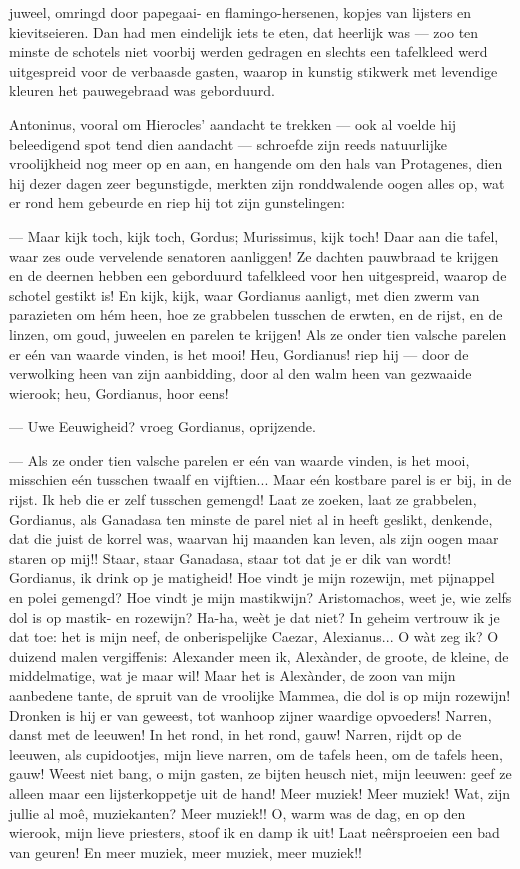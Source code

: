 \documentclass[a4paper, 12pt, oneside, dutch]{article}
\begin{document}
juweel, omringd door papegaai- en flamingo-hersenen, kopjes van lijsters en kievitseieren. Dan had men eindelijk iets te eten, dat heerlijk was --- zoo ten minste de schotels niet voorbij werden gedragen en slechts een tafelkleed werd uitgespreid voor de verbaasde gasten, waarop in kunstig stikwerk met levendige kleuren het pauwegebraad was geborduurd.

Antoninus, vooral om Hierocles' aandacht te trekken --- ook al voelde hij beleedigend spot tend dien aandacht --- schroefde zijn reeds natuurlijke vroolijkheid nog meer op en aan, en hangende om den hals van Protagenes, dien hij dezer dagen zeer begunstigde, merkten zijn ronddwalende oogen alles op, wat er rond hem gebeurde en riep hij tot zijn gunstelingen:

--- Maar kijk toch, kijk toch, Gordus; Murissimus, kijk toch! Daar aan die tafel, waar zes oude vervelende senatoren aanliggen! Ze dachten pauwbraad te krijgen en de deernen hebben een geborduurd tafelkleed voor hen uitgespreid, waarop de schotel gestikt is! En kijk, kijk, waar Gordianus aanligt, met dien zwerm van parazieten om hém heen, hoe ze grabbelen tusschen de erwten, en de rijst, en de linzen, om goud, juweelen en parelen te krijgen! Als ze onder tien valsche parelen er eén van waarde vinden, is het mooi! Heu, Gordianus! riep hij --- door de verwolking heen van zijn aanbidding, door al den walm heen van gezwaaide wierook; heu, Gordianus, hoor eens!

--- Uwe Eeuwigheid? vroeg Gordianus, oprijzende.

--- Als ze onder tien valsche parelen er eén van waarde vinden, is het mooi, misschien eén tusschen twaalf en vijftien... Maar eén kostbare parel is er bij, in de rijst. Ik heb die er zelf tusschen gemengd! Laat ze zoeken, laat ze grabbelen, Gordianus, als Ganadasa ten minste de parel niet al in heeft geslikt, denkende, dat die juist de korrel was, waarvan hij maanden kan leven, als zijn oogen maar staren op mij!! Staar, staar Ganadasa, staar tot dat je er dik van wordt! Gordianus, ik drink op je matigheid! Hoe vindt je mijn rozewijn, met pijnappel en polei gemengd? Hoe vindt je mijn mastikwijn? Aristomachos, weet je, wie zelfs dol is op mastik- en rozewijn? Ha-ha, weèt je dat niet? In geheim vertrouw ik je dat toe: het is mijn neef, de onberispelijke Caezar, Alexianus... O wàt zeg ik? O duizend malen vergiffenis: Alexander meen ik, Alexànder, de groote, de kleine, de middelmatige, wat je maar wil! Maar het is Alexànder, de zoon van mijn aanbedene tante, de spruit van de vroolijke Mammea, die dol is op mijn rozewijn! Dronken is hij er van geweest, tot wanhoop zijner waardige opvoeders! Narren, danst met de leeuwen! In het rond, in het rond, gauw! Narren, rijdt op de leeuwen, als cupidootjes, mijn lieve narren, om de tafels heen, om de tafels heen, gauw! Weest niet bang, o mijn gasten, ze bijten heusch niet, mijn leeuwen: geef ze alleen maar een lijsterkoppetje uit de hand! Meer muziek! Meer muziek! Wat, zijn jullie al moê, muziekanten? Meer muziek!! O, warm was de dag, en op den wierook, mijn lieve priesters, stoof ik en damp ik uit! Laat neêrsproeien een bad van geuren! En meer muziek, meer muziek, meer muziek!!
\end{document}
